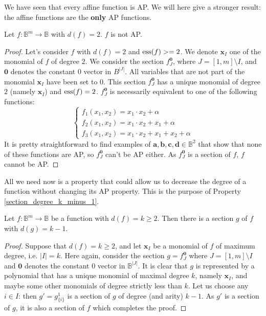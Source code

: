 We have seen that every affine function is AP. We will here give a stronger
result: the affine functions are the \textbf{only} AP functions.

\begin{property} \label{degree_2_not_AP}
 Let $f\colon \mathbb{B}^m\to \mathbb{B}$ with $d(f)=2$. $f$ is not AP.
\end{property}
\begin{proof}
  Let's consider $f$ with $d(f) = 2$ and $\operatorname{ess}(f) >= 2$. We denote $\mathbf{x}_I$ one of the
  monomial of $f$ of degree $2$. We consider the section $f^{\mathbf{0}}_J$,
  where $J = [1, m] \setminus I$,  and $\mathbf{0}$ denotes the constant 0
  vector in $B^{|J|}$. All variables that are not part of the monomial
  $\mathbf{x}_I$ have been set to $0$. This section $f^{\mathbf{0}}_J$ has a
  unique monomial of degree $2$ (namely $\mathbf{x}_I$) and $\operatorname{ess}(f) = 2$.
  $f^{\mathbf{0}}_J$ is necessarily equivalent to one of the following
  functions:
  $$
  \begin{cases}
    f_1(x_1, x_2) = x_1 \cdot x_2 + \alpha \\
    f_2(x_1, x_2) = x_1 \cdot x_2 + x_1 + \alpha\\
    f_3(x_1, x_2) = x_1 \cdot x_2 + x_1 + x_2 + \alpha
  \end{cases}$$
  It is pretty straightforward to find examples of $\mathbf{a}, \mathbf{b},
  \mathbf{c}, \mathbf{d} \in \mathbb{B}^2$
  that show that none of these functions are AP, so $f^{\mathbf{0}}_J$ can't
  be AP either. As $f^{\mathbf{0}}_J$ is a section of $f$, $f$ cannot be AP.
\end{proof}

All we need now is a property that could allow us to decrease the degree of a
function without changing its AP property. This is the purpose of
Property \ref{section_degree_k_minus_1}.

\begin{property}\label{section_degree_k_minus_1}
Let $f:\mathbb{B}^m\rightarrow \mathbb{B}$ be a function with
  $d(f)=k\geq 2$. Then there is a section $g$ of $f$ with $d(g)=k-1$.
\end{property}
\begin{proof}
Suppose that  $d(f)=k\geq 2$, and let $\mathbf{x}_I$ be a monomial of $f$ of
  maximum degree, i.e. $|I|=k$.  Here again, consider the section $g =
  f^{\mathbf{0}}_J$ where $J = [1, m] \setminus I$ and $\mathbf{0}$ denotes the
  constant $0$ vector in $\mathbb{B}^{|J|}$. It is clear that $g$ is
  represented by a  polynomial that has a unique monomial of maximal degree
  $k$, namely $\mathbf{x}_I$, and maybe some other monomials of degree strictly
  less than $k$.  Let us choose any $i \in I$: then $g' = g^1_{\{i\}}$ is a
  section of $g$ of degree (and arity) $k-1$. As $g'$ is a section of $g$, it
  is also a section of $f$ which completes the proof.
\end{proof}

